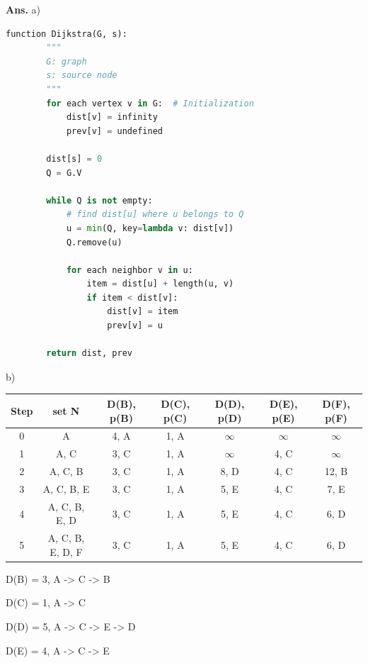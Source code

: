 \documentclass[12pt, a4paper, UTF8, fontset=windows]{ctexbook}
\newenvironment{solution}{\par\noindent\textbf{Ans.}}{\par}
\begin{document}
\begin{solution}
    a)

    \begin{lstlisting}[language=python]
    function Dijkstra(G, s):
        """
        G: graph
        s: source node
        """
        for each vertex v in G:  # Initialization
            dist[v] = infinity
            prev[v] = undefined

        dist[s] = 0
        Q = G.V

        while Q is not empty:
            # find dist[u] where u belongs to Q
            u = min(Q, key=lambda v: dist[v])
            Q.remove(u)

            for each neighbor v in u:
                item = dist[u] + length(u, v)
                if item < dist[v]:
                    dist[v] = item
                    prev[v] = u

        return dist, prev
    \end{lstlisting}

    b)

    \begin{table}[H]
        \centering
        \begin{tabular}{c|c|c|c|c|c|c}
            \hline
            \rowcolor{gray!30}
            Step & set N & D(B), p(B) & D(C), p(C) & D(D), p(D) & D(E), p(E) & D(F), p(F) \\
            \hline
            0 & A & 4, A & 1, A & $\infty$ & $\infty$ & $\infty$ \\
            \hline
            1 & A, C & 3, C & 1, A & $\infty$ & 4, C & $\infty$ \\
            \hline
            2 & A, C, B & 3, C & 1, A & 8, D & 4, C & 12, B \\
            \hline
            3 & A, C, B, E & 3, C & 1, A & 5, E & 4, C & 7, E \\
            \hline
            4 & A, C, B, E, D & 3, C & 1, A & 5, E & 4, C & 6, D \\
            \hline
            5 & A, C, B, E, D, F & 3, C & 1, A & 5, E & 4, C & 6, D \\
            \hline
        \end{tabular}
    \end{table}

    D(B) = 3, A -> C -> B

    D(C) = 1, A -> C

    D(D) = 5, A -> C -> E -> D

    D(E) = 4, A -> C -> E


\end{solution}
\end{document}
